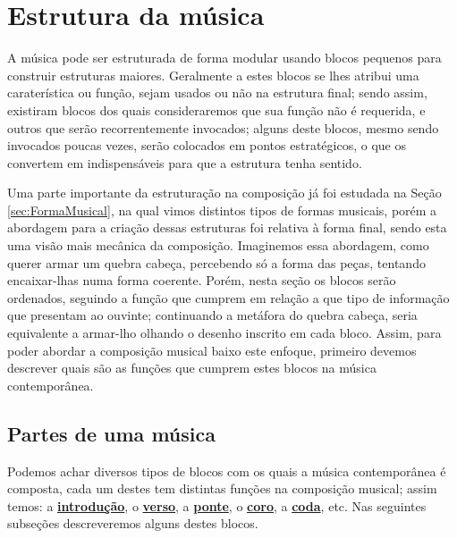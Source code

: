 
\section{Estrutura da música}
\label{sec:estruturadamusica}

A música pode ser estruturada de forma modular 
usando blocos pequenos para construir estruturas maiores.
Geralmente a estes blocos se lhes atribui uma caraterística ou função, 
sejam usados ou não na estrutura final;
sendo assim, existiram blocos dos quais consideraremos que sua função não é requerida,
e outros que serão recorrentemente invocados;
alguns deste blocos, mesmo sendo invocados poucas vezes, 
serão colocados em pontos estratégicos, o que os convertem em indispensáveis 
para que a estrutura tenha sentido.

Uma parte importante da estruturação na composição já foi estudada na Seção \ref{sec:FormaMusical},
na qual vimos distintos tipos de formas musicais, 
porém a abordagem para a criação dessas estruturas foi relativa à forma final,
sendo esta uma visão mais mecânica da composição.
Imaginemos essa abordagem, como querer armar um quebra cabeça,
percebendo só a forma das peças, tentando encaixar-lhas numa forma coerente.
Porém, nesta seção  os blocos serão ordenados, 
seguindo a função que cumprem em relação a que tipo de informação que presentam ao ouvinte;
continuando a metáfora do quebra cabeça, seria equivalente a armar-lho olhando o desenho inscrito em cada bloco.
Assim, para poder abordar a composição musical baixo este enfoque, 
primeiro devemos descrever quais são as funções que cumprem estes blocos na música contemporânea.


\subsection{Partes de uma música}
\label{subsec:partesmusica}
 Podemos achar diversos tipos de blocos com os quais a música contemporânea é composta, 
cada um destes tem distintas funções na composição musical;
assim temos:
a \hyperref[ref:Introducao]{\textbf{introdução}},
o \hyperref[ref:Verse]{\textbf{verso}},
a \hyperref[ref:Ponte]{\textbf{ponte}},
o \hyperref[ref:Coro]{\textbf{coro}},
a \hyperref[ref:Coda]{\textbf{coda}},
etc.
Nas seguintes subseções descreveremos alguns destes blocos.

